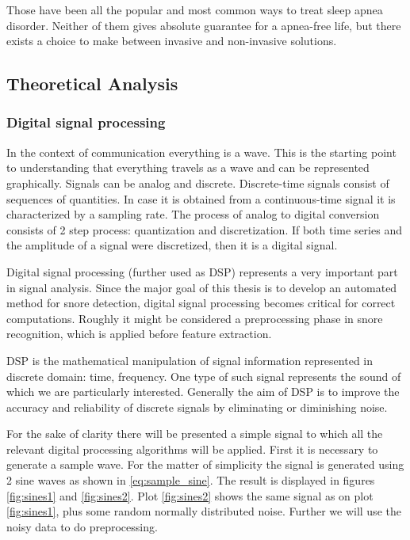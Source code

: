Those have been all the popular and most common ways to treat sleep apnea disorder. Neither of them gives absolute guarantee for a apnea-free life, but there exists a choice to make between invasive and non-invasive solutions. 

\subsection{Theoretical Analysis}
\subsubsection{Digital signal processing}\label{subsubsec:dsp}
In the context of communication everything is a wave. This is the starting point to understanding that everything travels as a wave and can be represented graphically. Signals can be analog and discrete. Discrete-time signals consist of sequences of quantities. In case it is obtained from a continuous-time signal it is characterized by a sampling rate. The process of analog to digital conversion consists of 2 step process: quantization and discretization. If both time series and the amplitude of a signal were discretized, then it is a digital signal.

Digital signal processing (further used as DSP) represents a very important part in signal analysis. Since the major goal of this thesis is to develop an automated method for snore detection, digital signal processing becomes critical for correct computations. Roughly it might be considered a preprocessing phase in snore recognition, which is applied before feature extraction. 

DSP is the mathematical manipulation of signal information represented in discrete domain: time, frequency. One type of such signal represents the sound of which we are particularly interested. Generally the aim of DSP is to improve the accuracy and reliability of discrete signals by eliminating or diminishing noise.

For the sake of clarity there will be presented a simple signal to which all the relevant digital processing algorithms will be applied. First it is necessary to generate a sample wave. For the matter of simplicity the signal is generated using 2 sine waves as shown in \eqref{eq:sample_sine}. The result is displayed in figures \ref{fig:sines1} and \ref{fig:sines2}. Plot \ref{fig:sines2} shows the same signal as on plot \ref{fig:sines1}, plus some random normally distributed noise. Further we will use the noisy data to do preprocessing.


